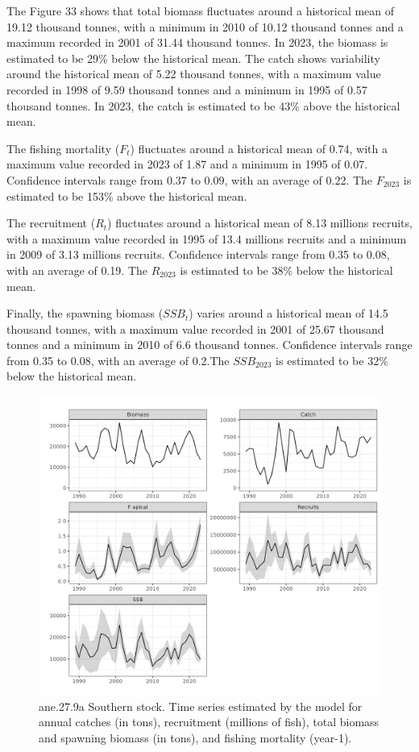 \documentclass[
]{article}
\begin{document}
The Figure 33 shows that total biomass fluctuates around a historical
mean of 19.12 thousand tonnes, with a minimum in 2010 of 10.12 thousand
tonnes and a maximum recorded in 2001 of 31.44 thousand tonnes. In 2023,
the biomass is estimated to be 29\% below the historical mean. The catch
shows variability around the historical mean of 5.22 thousand tonnes,
with a maximum value recorded in 1998 of 9.59 thousand tonnes and a
minimum in 1995 of 0.57 thousand tonnes. In 2023, the catch is estimated
to be 43\% above the historical mean.

The fishing mortality (\(F_t\)) fluctuates around a historical mean of
0.74, with a maximum value recorded in 2023 of 1.87 and a minimum in
1995 of 0.07. Confidence intervals range from 0.37 to 0.09, with an
average of 0.22. The \(F_{2023}\) is estimated to be 153\% above the
historical mean.

The recruitment (\(R_t\)) fluctuates around a historical mean of 8.13
millions recruits, with a maximum value recorded in 1995 of 13.4
millions recruits and a minimum in 2009 of 3.13 millions recruits.
Confidence intervals range from 0.35 to 0.08, with an average of 0.19.
The \(R_{2023}\) is estimated to be 38\% below the historical mean.

Finally, the spawning biomass (\(SSB_{t}\)) varies around a historical
mean of 14.5 thousand tonnes, with a maximum value recorded in 2001 of
25.67 thousand tonnes and a minimum in 2010 of 6.6 thousand tonnes.
Confidence intervals range from 0.35 to 0.08, with an average of 0.2.The
\(SSB_{2023}\) is estimated to be 32\% below the historical mean.

\begin{figure}[H]

{\centering \includegraphics[width=0.95\linewidth]{report/run/S1.0_4FLEETS_SelECO_RecIndex_Mnewfix/fig_time_series} 

}

\caption{ane.27.9a Southern stock. Time series estimated by the model for annual catches (in tons), recruitment (millions of fish), total biomass and spawning biomass (in tons), and fishing mortality (year-1).}\label{fig:unnamed-chunk-65}
\end{figure}
\end{document}
